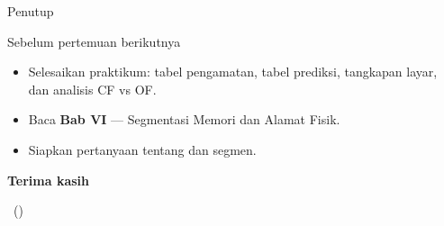 \documentclass[aspectratio=169,11pt]{beamer}
\begin{document}
\begin{frame}{Penutup}
\begin{block}{Sebelum pertemuan berikutnya}
\small
\begin{itemize}
    \item Selesaikan praktikum: tabel pengamatan, tabel prediksi,
          tangkapan layar, dan analisis CF vs OF.
    \item Baca \textbf{Bab VI} — Segmentasi Memori dan Alamat Fisik.
    \item Siapkan pertanyaan tentang  dan
           segmen.
\end{itemize}
\end{block}

\vspace{0.4em}
\begin{center}
{\color{obeBlue}\sffamily\large\bfseries Terima kasih\par}
\vspace{0.15em}
{\color{obeGray}\sffamily\small \NamaMK\ (\KodeMK)
\textbullet\ \SemesterTeks\par}
\end{center}
\end{frame}
\end{document}
